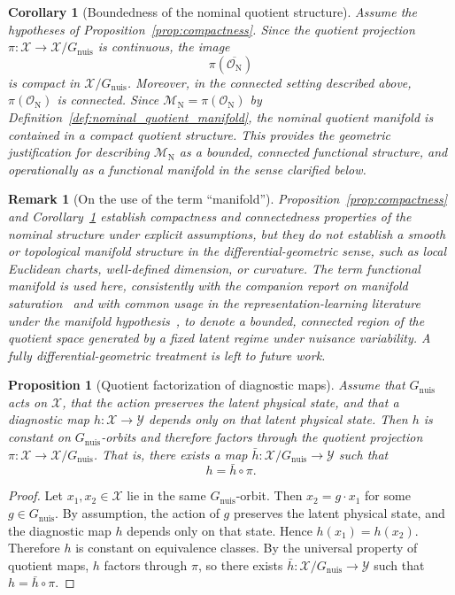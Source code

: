 \documentclass[11pt,letterpaper]{article}
\newtheorem{proposition}{Proposition}
\newtheorem{corollary}{Corollary}
\newtheorem{remark}{Remark}
\newcommand{\X}{\ensuremath{\mathcal{X}}}
\newcommand{\Mnominal}{\ensuremath{\mathcal{M}_{\mathrm{N}}}}
\newcommand{\Gnuis}{\ensuremath{G_{\mathrm{nuis}}}}
\begin{document}
\begin{corollary}[Boundedness of the nominal quotient structure]
\label{cor:bounded_manifold}
Assume the hypotheses of Proposition~\ref{prop:compactness}.
Since the quotient projection \(\pi:\X\to\X/\Gnuis\) is continuous, the image
\[
\pi\left(\overline{\mathcal{O}_{\mathrm N}}\right)
\]
is compact in \(\X/\Gnuis\).
Moreover, in the connected setting described above, \(\pi(\mathcal{O}_{\mathrm N})\) is connected.
Since \(\Mnominal=\pi(\mathcal{O}_{\mathrm N})\) by Definition~\ref{def:nominal_quotient_manifold}, the nominal quotient manifold is contained in a compact quotient structure.
This provides the geometric justification for describing \(\Mnominal\) as a bounded, connected functional structure, and operationally as a functional manifold in the sense clarified below.
\end{corollary}

\begin{remark}[On the use of the term ``manifold'']
\label{rem:manifold_terminology}
Proposition~\ref{prop:compactness} and Corollary~\ref{cor:bounded_manifold} establish compactness and connectedness properties of the nominal structure under explicit assumptions, but they do not establish a smooth or topological manifold structure in the differential-geometric sense, such as local Euclidean charts, well-defined dimension, or curvature.
The term \emph{functional manifold} is used here, consistently with the companion report on manifold saturation~\cite{disanti2026} and with common usage in the representation-learning literature under the manifold hypothesis~\cite{bronstein2021}, to denote a bounded, connected region of the quotient space generated by a fixed latent regime under nuisance variability.
A fully differential-geometric treatment is left to future work.
\end{remark}

\begin{proposition}[Quotient factorization of diagnostic maps]
\label{prop:quotient_diagnosis}
Assume that \(\Gnuis\) acts on \(\X\), that the action preserves the latent physical state, and that a diagnostic map \(h:\X\to\mathcal{Y}\) depends only on that latent physical state.
Then \(h\) is constant on \(\Gnuis\)-orbits and therefore factors through the quotient projection \(\pi:\X\to\X/\Gnuis\).
That is, there exists a map \(\bar h:\X/\Gnuis\to\mathcal{Y}\) such that
\[
h = \bar h \circ \pi.
\]
\end{proposition}

\begin{proof}
Let \(x_1,x_2\in\X\) lie in the same \(\Gnuis\)-orbit.
Then \(x_2=g\cdot x_1\) for some \(g\in\Gnuis\).
By assumption, the action of \(g\) preserves the latent physical state, and the diagnostic map \(h\) depends only on that state.
Hence \(h(x_1)=h(x_2)\).
Therefore \(h\) is constant on equivalence classes.
By the universal property of quotient maps, \(h\) factors through \(\pi\), so there exists \(\bar h:\X/\Gnuis\to\mathcal{Y}\) such that \(h=\bar h\circ\pi\).
\end{proof}
\end{document}
